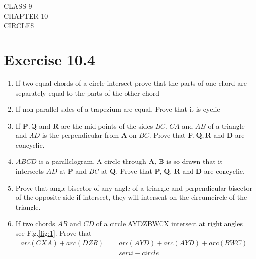 \documentclass[12pt]{article}
\providecommand{\brak}[1]{\ensuremath{\left(#1\right)}}
\let\vec\mathbf
\begin{document}
\begin{center}
\textbf\large{CLASS-9\\CHAPTER-10 \\ CIRCLES}
\end{center}
\section*{Exercise 10.4}
\begin{enumerate}
\item If two equal chords of a circle intersect prove that the parts of one chord are separately equal to the parts of the other chord.
\item If non-parallel sides of a trapezium are equal. Prove that it is cyclic
\item If $\vec{P},\vec{Q}$ and $\vec{R}$ are the mid-points of the sides $BC$, $CA$ and $AB$ of a triangle and $AD$ is the perpendicular from $\vec{A}$ on $BC$. Prove that $\vec{P},\vec{Q},\vec{R}$ and $\vec{D}$ are concyclic.
\item $ABCD$ is a parallelogram. A circle through $\vec{A}$, $\vec{B}$ is so drawn that it intersects $AD$ at $\vec{P}$ and $BC$ at $\vec{Q}$. Prove that $\vec{P}$, $\vec{Q}$, $\vec{R}$ and $\vec{D}$ are concyclic.
\item Prove that angle bisector of any angle of a triangle and perpendicular bisector of the opposite side if intersect, they will intersent on the circumcircle of the triangle.
\item If two chords $AB$ and $CD$ of a circle AYDZBWCX intersect at right angles see Fig.\ref{fig:1}. Prove that
	\begin{align}
		arc\brak{CXA}+arc\brak{DZB}&=arc\brak{AYD}+arc\brak{AYD}+arc\brak{BWC}\\&=semi-circle
	\end{align}

\end{enumerate}
\end{document}
